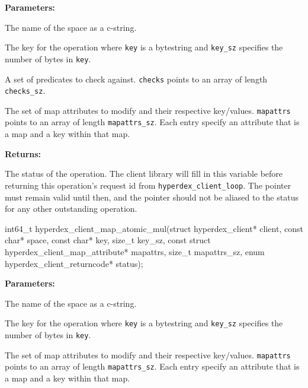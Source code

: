 \noindent\textbf{Parameters:}
\begin{description}[labelindent=\widthof{{\texttt{mapattrs}, \texttt{mapattrs\_sz}}},leftmargin=*,noitemsep,nolistsep,align=right]
\item[\texttt{space}] The name of the space as a c-string.
\item[\texttt{key}, \texttt{key\_sz}] The key for the operation where \texttt{key} is a bytestring and \texttt{key\_sz} specifies the number of bytes in \texttt{key}.
\item[\texttt{checks}, \texttt{checks\_sz}] A set of predicates to check against.  \texttt{checks} points to an array of length \texttt{checks\_sz}.
\item[\texttt{mapattrs}, \texttt{mapattrs\_sz}] The set of map attributes to modify and their respective key/values.  \texttt{mapattrs} points to an array of length \texttt{mapattrs\_sz}.  Each entry specify an attribute that is a map and a key within that map.
\end{description}

\noindent\textbf{Returns:}
\begin{description}[labelindent=\widthof{{\texttt{status}}},leftmargin=*,noitemsep,nolistsep,align=right]
\item[\texttt{status}] The status of the operation.  The client library will fill in this variable before returning this operation's request id from \texttt{hyperdex\_client\_loop}.  The pointer must remain valid until then, and the pointer should not be aliased to the status for any other outstanding operation.
\end{description}

\funcsep
\begin{ccode}
int64_t hyperdex_client_map_atomic_mul(struct hyperdex_client* client,
                const char* space,
                const char* key, size_t key_sz,
                const struct hyperdex_client_map_attribute* mapattrs, size_t mapattrs_sz,
                enum hyperdex_client_returncode* status);
\end{ccode}
\funcdesc 

\noindent\textbf{Parameters:}
\begin{description}[labelindent=\widthof{{\texttt{mapattrs}, \texttt{mapattrs\_sz}}},leftmargin=*,noitemsep,nolistsep,align=right]
\item[\texttt{space}] The name of the space as a c-string.
\item[\texttt{key}, \texttt{key\_sz}] The key for the operation where \texttt{key} is a bytestring and \texttt{key\_sz} specifies the number of bytes in \texttt{key}.
\item[\texttt{mapattrs}, \texttt{mapattrs\_sz}] The set of map attributes to modify and their respective key/values.  \texttt{mapattrs} points to an array of length \texttt{mapattrs\_sz}.  Each entry specify an attribute that is a map and a key within that map.
\end{description}

